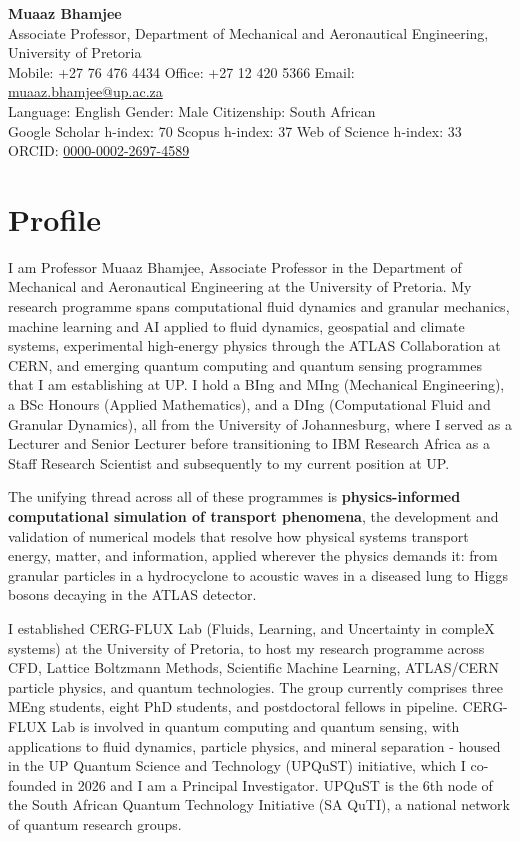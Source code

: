 \documentclass[11pt, a4paper]{article}
\begin{document}
\begin{center}
  {\LARGE\bfseries Muaaz Bhamjee}\\[3pt]
  {\large Associate Professor, Department of Mechanical and Aeronautical Engineering, University of Pretoria}\\[4pt]
  Mobile: +27 76 476 4434 \quad Office: +27 12 420 5366 \quad Email: \href{mailto:muaaz.bhamjee@up.ac.za}{muaaz.bhamjee@up.ac.za}\\[2pt]
  Language: English \quad Gender: Male \quad Citizenship: South African\\[2pt]
  Google Scholar h-index: 70 \quad Scopus h-index: 37 \quad Web of Science h-index: 33 \quad ORCID: \href{https://orcid.org/0000-0002-2697-4589}{0000-0002-2697-4589}
\end{center}

\section{Profile}

I am Professor Muaaz Bhamjee, Associate Professor in the Department of Mechanical and Aeronautical Engineering at the University of Pretoria. 
My research programme spans computational fluid dynamics and granular mechanics, machine learning and AI applied to fluid dynamics, geospatial and climate systems, 
experimental high-energy physics through the ATLAS Collaboration at CERN, and emerging quantum computing and quantum sensing programmes that I am establishing at UP. 
I hold a BIng and MIng (Mechanical Engineering), a BSc Honours (Applied Mathematics), and a DIng (Computational Fluid and Granular Dynamics), all from the University of Johannesburg, 
where I served as a Lecturer and Senior Lecturer before transitioning to IBM Research Africa as a Staff Research Scientist and subsequently to my current position at UP.

The unifying thread across all of these programmes is \textbf{physics-informed computational simulation of transport phenomena}, the development and validation of numerical models 
that resolve how physical systems transport energy, matter, and information, applied wherever the physics demands it: from granular particles in a 
hydrocyclone to acoustic waves in a diseased lung to Higgs bosons decaying in the ATLAS detector.

I established CERG-FLUX Lab (Fluids, Learning, and Uncertainty in compleX systems) at the University of Pretoria, 
to host my research programme across CFD, Lattice Boltzmann Methods, Scientific Machine Learning, ATLAS/CERN particle physics, and quantum technologies. 
The group currently comprises three MEng students, eight PhD students, and postdoctoral fellows in pipeline. CERG-FLUX Lab is involved in quantum computing and quantum sensing, 
with applications to fluid dynamics, particle physics, and mineral separation - housed in the UP Quantum Science and Technology (UPQuST) initiative, which I co-founded in 2026 
and I am a Principal Investigator. UPQuST is the 6th node of the South African Quantum Technology Initiative (SA QuTI), a national network of quantum research groups.
\end{document}
